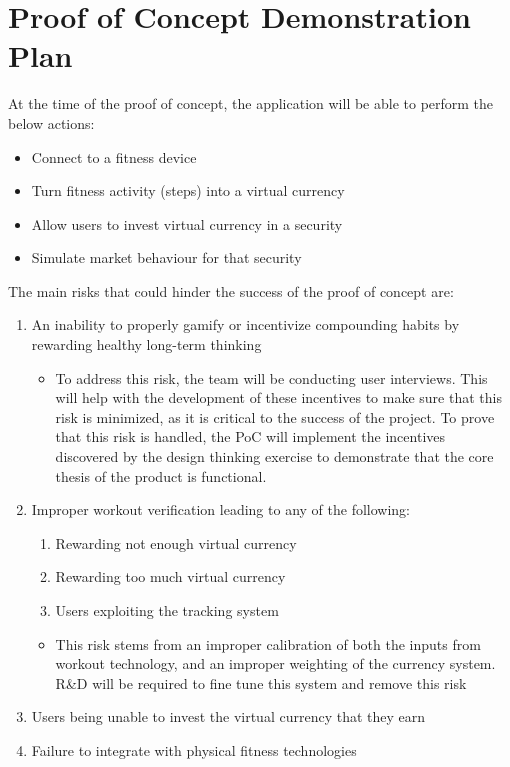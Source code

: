 \documentclass{article}
\begin{document}
\section{Proof of Concept Demonstration Plan}

At the time of the proof of concept, the application will be able to perform the below actions:
\begin{itemize}
    \item Connect to a fitness device
    \item Turn fitness activity (steps) into a virtual currency
    \item Allow users to invest virtual currency in a security
    \item Simulate market behaviour for that security
\end{itemize}

\bigbreak
\noindent The main risks that could hinder the success of the proof of concept are:
\begin{enumerate}
    \item An inability to properly gamify or incentivize compounding habits by rewarding healthy long-term thinking
    \begin{itemize}
        \item To address this risk, the team will be conducting user interviews.
        This will help with the development of these incentives to make sure that this risk is minimized, as it is critical to the success of the project.
        To prove that this risk is handled, the PoC will implement the incentives discovered by the design thinking exercise to demonstrate that the core thesis of the product is functional.
    \end{itemize}
    \item Improper workout verification leading to any of the following:
    \begin{enumerate}
        \item Rewarding not enough virtual currency
        \item Rewarding too much virtual currency
        \item Users exploiting the tracking system
    \end{enumerate}
    \begin{itemize}
        \item This risk stems from an improper calibration of both the inputs from workout technology, and an improper weighting of the currency system.
        R\&D will be required to fine tune this system and remove this risk
    \end{itemize}
    \item Users being unable to invest the virtual currency that they earn
    \item Failure to integrate with physical fitness technologies
\end{enumerate}
\end{document}
